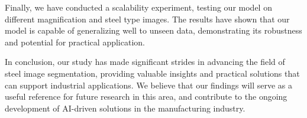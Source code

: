 \documentclass[]{article}
\begin{document}
Finally, we have conducted a scalability experiment, testing our model on different magnification and steel type images. The results have shown that our model is capable of generalizing well to unseen data, demonstrating its robustness and potential for practical application.

In conclusion, our study has made significant strides in advancing the field of steel image segmentation, providing valuable insights and practical solutions that can support industrial applications. We believe that our findings will serve as a useful reference for future research in this area, and contribute to the ongoing development of AI-driven solutions in the manufacturing industry.






\end{document}
